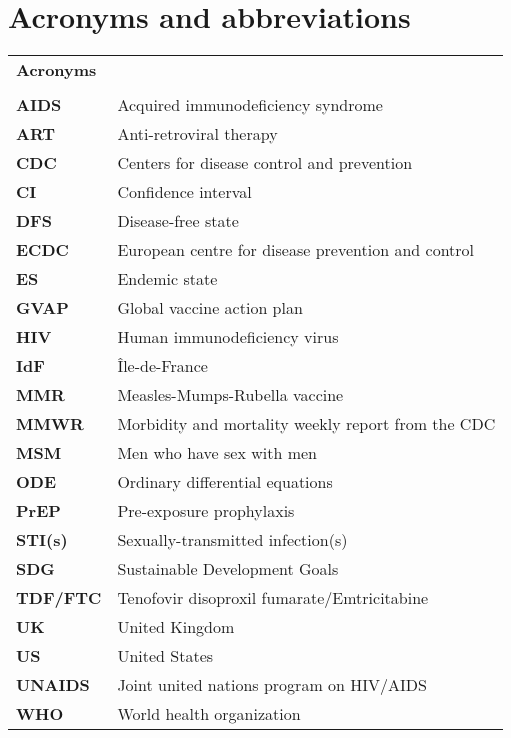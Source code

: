 \chapter*{Acronyms and abbreviations}


\begin{table}[H]
\begin{tabular}{ll}
	\multicolumn{2}{l}{\large \bf Acronyms}\\
	\\
	\bf AIDS		& Acquired immunodeficiency syndrome\\
	\bf ART 		& Anti-retroviral therapy \\
	\bf CDC 		& Centers for disease control and prevention\\
	\bf CI 		& Confidence interval \\
	\bf DFS 		& Disease-free state \\
	\bf ECDC 		& European centre for disease prevention and control\\
	\bf ES 		& Endemic state \\
	\bf GVAP 		& Global vaccine action plan\\
	\bf HIV 		& Human immunodeficiency virus \\
	\bf IdF 		& \^Ile-de-France \\
	\bf MMR 		& Measles-Mumps-Rubella vaccine\\
	\bf MMWR	& Morbidity and mortality weekly report from the CDC\\
	\bf MSM 		& Men who have sex with men \\
	\bf ODE 		& Ordinary differential equations \\
	\bf PrEP 		& Pre-exposure prophylaxis \\
	\bf STI(s)		& Sexually-transmitted infection(s) \\
	\bf SDG		& Sustainable Development Goals \\
	\bf TDF/FTC 	& Tenofovir disoproxil fumarate/Emtricitabine \\
	\bf UK 		& United Kingdom\\
	\bf US		& United States\\
	\bf UNAIDS 	& Joint united nations program on HIV/AIDS \\
	\bf WHO		& World health organization \\
\end{tabular}
\end{table}

